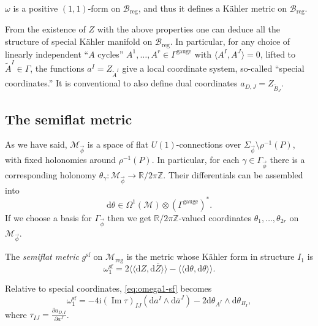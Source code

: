 \documentclass[12pt,letterpaper,reqno]{article}
\numberwithin{equation}{section}
\newcommand{\cB}{\ensuremath{\mathcal B}}
\newcommand{\cM}{\ensuremath{\mathcal M}}
\newcommand{\R}{\ensuremath{\mathbb R}}
\newcommand{\C}{\ensuremath{\mathbb C}}
\newcommand{\Z}{\ensuremath{\mathbb Z}}
\newcommand{\kahler}{K\"ahler\xspace}
\newcommand{\I}{{\mathrm i}}
\newcommand{\de}{\mathrm{d}}
\newcommand{\reg}{\mathrm{reg}}
\renewcommand{\sf}{\mathrm{sf}}
\newcommand{\gauge}{\mathrm{gauge}}
\newcommand{\IP}[1]{\langle#1\rangle}
\newcommand{\DIP}[1]{\langle\!\langle#1\rangle\!\rangle}
\newcommand{\vphi}{{\vec\phi}}
\newcommand{\ti}[1]{\textit{#1}}
\DeclareMathOperator{\im}{Im}
\newcommand{\Sp}{\mathrm{Sp}}
\begin{document}
\begin{prop} $\omega$ is a
positive $(1,1)$-form on $\cB_\reg$, and thus it defines
a \kahler metric on $\cB_\reg$.
\end{prop}

From the existence of $Z$ with the above properties
one can deduce all the structure
of special \kahler manifold on $\cB_\reg$. In particular,
for any choice of linearly independent ``$A$ cycles''
$A^1, \dots, A^r \in \Gamma^\gauge$
with $\IP{A^I, A^J} = 0$, lifted to $\tilde A^I \in \Gamma$, 
the functions
$a^I = Z_{\tilde A^I}$ give a local coordinate
system, so-called ``special coordinates.''
It is conventional to also define dual coordinates
$a_{D,J} = Z_{\tilde B_J}$.




\subsection{The semiflat metric}


As we have said, $\cM_\vphi$ is a space of flat $U(1)$-connections
over $\Sigma_\vphi \setminus \rho^{-1}(P)$, 
with fixed holonomies around $\rho^{-1}(P)$.
In particular, for each $\gamma \in \Gamma_\vphi$ 
there is a corresponding
holonomy $\theta_\gamma: \cM_\vphi \to \R / 2 \pi \Z$.
Their differentials can be assembled into
\begin{equation}
  \de \theta \in \Omega^1(\cM) \otimes (\Gamma^\gauge)^*.
\end{equation}
If we choose a basis for $\Gamma_\vphi$ 
then we get $\R / 2 \pi \Z$-valued coordinates $\theta_1, \dots, \theta_{2r}$
on $\cM_\vphi$.

\begin{defn}
The \ti{semiflat metric}  $g^\sf$ on $\cM_\reg$ is the metric 
whose \kahler form in structure $I_1$ is
\begin{equation} \label{eq:omega1-sf}
  \omega^\sf_1 = 2 \DIP{\de Z, \de \bar{Z}} - \DIP{\de \theta, \de \theta}.
\end{equation}
\end{defn}                                   
Relative to special coordinates, \eqref{eq:omega1-sf} becomes
\begin{equation}
	\omega_1^\sf = -4 \I (\im \tau)_{IJ} (\de a^I \wedge \de \bar{a}^J) - 2 \de \theta_{A^I} \wedge \de \theta_{B_I},
\end{equation}
where $\tau_{IJ} = \frac{\partial a_{D,I}}{\partial a^J}$.
\end{document}
